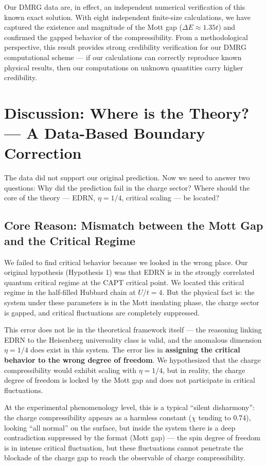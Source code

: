 \documentclass[prb,reprint,twocolumn,superscriptaddress]{revtex4-2}
\begin{document}
Our DMRG data are, in effect, an independent numerical verification of this known exact solution. With eight independent finite-size calculations, we have captured the existence and magnitude of the Mott gap ($\Delta E \approx 1.35t$) and confirmed the gapped behavior of the compressibility. From a methodological perspective, this result provides strong credibility verification for our DMRG computational scheme --- if our calculations can correctly reproduce known physical results, then our computations on unknown quantities carry higher credibility.

\section{Discussion: Where is the Theory? --- A Data-Based Boundary Correction}\label{sec:discussion}

The data did not support our original prediction. Now we need to answer two questions: Why did the prediction fail in the charge sector? Where should the core of the theory --- EDRN, $\eta = 1/4$, critical scaling --- be located?

\subsection{Core Reason: Mismatch between the Mott Gap and the Critical Regime}

We failed to find critical behavior because we looked in the wrong place. Our original hypothesis (Hypothesis 1) was that EDRN is in the strongly correlated quantum critical regime at the CAPT critical point. We located this critical regime in the half-filled Hubbard chain at $U/t = 4$. But the physical fact is: the system under these parameters is in the Mott insulating phase, the charge sector is gapped, and critical fluctuations are completely suppressed.

This error does not lie in the theoretical framework itself --- the reasoning linking EDRN to the Heisenberg universality class is valid, and the anomalous dimension $\eta = 1/4$ does exist in this system. The error lies in \textbf{assigning the critical behavior to the wrong degree of freedom}. We hypothesized that the charge compressibility would exhibit scaling with $\eta = 1/4$, but in reality, the charge degree of freedom is locked by the Mott gap and does not participate in critical fluctuations.

At the experimental phenomenology level, this is a typical ``silent disharmony'': the charge compressibility appears as a harmless constant ($\chi$ tending to $0.74$), looking ``all normal'' on the surface, but inside the system there is a deep contradiction suppressed by the format (Mott gap) --- the spin degree of freedom is in intense critical fluctuation, but these fluctuations cannot penetrate the blockade of the charge gap to reach the observable of charge compressibility.
\end{document}
